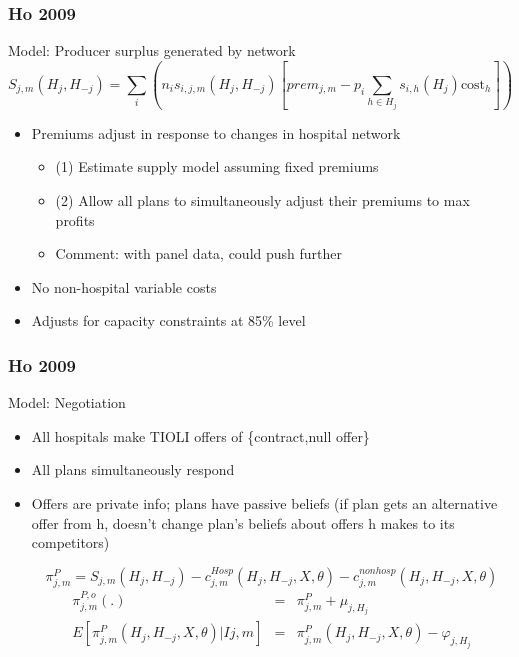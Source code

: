 \documentclass[xcolor=pdftex,dvipsnames,table,mathserif]{beamer}
\begin{document}
\begin{frame}
\frametitle{Ho 2009}

Model: Producer surplus generated by network
\[
S_{j,m}(H_{j},H_{-j})=\sum%
\limits_{i}(n_{i}s_{i,j,m}(H_{j},H_{-j})[prem_{j,m}-p_{i}\sum \limits_{h\in
H_{j}}s_{i,h}(H_{j})\text{cost}_{h}])
\]

\begin{itemize}
\item Premiums adjust in response to changes in hospital network
\begin{itemize}
\item (1) Estimate supply model assuming fixed premiums
\item (2) Allow all plans to simultaneously adjust their premiums to max profits
\item Comment: with panel data, could push further
\end{itemize}
\item No non-hospital variable costs
\item Adjusts for capacity constraints at 85\% level

\end{itemize}

\end{frame}

\begin{frame}
\frametitle{Ho 2009}

Model: Negotiation
\begin{itemize}
\item All hospitals make TIOLI offers of \{contract,null offer\}
\item All plans simultaneously respond
\item Offers are private info; plans have passive beliefs (if plan gets an alternative offer from h, doesn't change plan's beliefs about offers h makes to its competitors)

\[
\pi _{j,m}^{P} =S_{j,m}(H_{j},H_{-j})-c_{j,m}^{Hosp}(H_{j},H_{-j},X,\theta
)-c_{j,m}^{nonhosp}(H_{j},H_{-j},X,\theta )
\]
\begin{eqnarray*}
\pi _{j,m}^{P,o}(.) &=&\pi _{j,m}^{P}+\mu _{j,H_{j}} \\
E[\pi _{j,m}^{P}(H_{j},H_{-j},X,\theta )|Ij,m] &=&\pi
_{j,m}^{P}(H_{j},H_{-j},X,\theta )-\varphi _{j,H_{j}}
\end{eqnarray*}

\end{itemize}

\end{frame}
\end{document}
